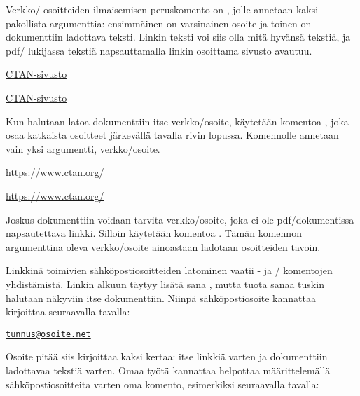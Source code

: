 Verkko\-/ osoitteiden ilmaisemisen peruskomento on ,
jolle annetaan kaksi pakollista argumenttia: ensimmäinen on varsinainen
osoite ja toinen on dokumenttiin ladottava teksti. Linkin teksti voi
siis olla mitä hyvänsä tekstiä, ja pdf\-/ lukijassa tekstiä
napsauttamalla linkin osoittama sivusto avautuu.

\begin{koodilohkosis}
\href{https://www.ctan.org/}{CTAN-sivusto}
\end{koodilohkosis}

\begin{tulossis}
  \href{https://www.ctan.org/}{CTAN-sivusto}
\end{tulossis}

Kun halutaan latoa dokumenttiin itse verkko\-/osoite, käytetään komentoa
,  joka osaa katkaista osoitteet
järkevällä tavalla rivin lopussa. Komennolle annetaan vain yksi
argumentti, verkko\-/osoite.

\begin{koodilohkosis}
\url{https://www.ctan.org/}
\end{koodilohkosis}

\begin{tulossis}
  \url{https://www.ctan.org/}
\end{tulossis}

Joskus dokumenttiin voidaan tarvita verkko\-/osoite, joka ei ole
pdf\-/dokumentissa napsautettava linkki. Silloin käytetään komentoa
. Tämän komennon argumenttina oleva verkko\-/osoite
ainoastaan ladotaan osoitteiden tavoin.

Linkkinä toimivien sähköpostiosoitteiden latominen vaatii
- ja \-/ komentojen yhdistämistä.
Linkin alkuun täytyy lisätä sana , mutta tuota sanaa
tuskin halutaan näkyviin itse dokumenttiin. Niinpä sähköpostiosoite
kannattaa kirjoittaa seuraavalla tavalla:

\begin{koodilohkosis}
\href{mailto:tunnus@osoite.net}{\nolinkurl{tunnus@osoite.net}}
\end{koodilohkosis}

Osoite pitää siis kirjoittaa kaksi kertaa: itse linkkiä varten ja
dokumenttiin ladottavaa tekstiä varten. Omaa työtä kannattaa helpottaa
määrittelemällä sähköpostiosoitteita varten oma komento, esimerkiksi
seuraavalla tavalla:


